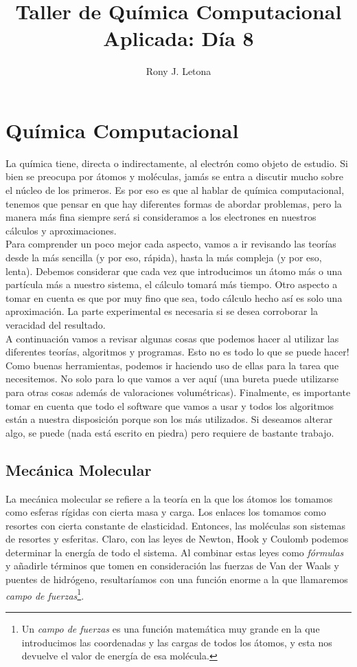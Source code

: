 \documentclass[10pt,letterpaper]{article}
\author{Rony J. Letona}
\title{Taller de Qu\'imica Computacional Aplicada: D\'ia 8}
\begin{document}
\maketitle

\section{Qu\'imica Computacional}
La qu\'imica tiene, directa o indirectamente, al electr\'on como objeto de estudio. Si bien se preocupa por \'atomos y mol\'eculas, jam\'as se entra a discutir mucho sobre el n\'ucleo de los primeros. Es por eso es que al hablar de qu\'imica computacional, tenemos que pensar en que hay diferentes formas de abordar problemas, pero la manera m\'as fina siempre ser\'a si consideramos a los electrones en nuestros c\'alculos y aproximaciones.\\

Para comprender un poco mejor cada aspecto, vamos a ir revisando las teor\'ias desde la m\'as sencilla (y por eso, r\'apida), hasta la m\'as compleja (y por eso, lenta). Debemos considerar que cada vez que introducimos un \'atomo m\'as o una part\'icula m\'as a nuestro sistema, el c\'alculo tomar\'a m\'as tiempo. Otro aspecto a tomar en cuenta es que por muy fino que sea, todo c\'alculo hecho as\'i es solo una aproximaci\'on. La parte experimental es necesaria si se desea corroborar la veracidad del resultado.\\

A continuaci\'on vamos a revisar algunas cosas que podemos hacer al utilizar las diferentes teor\'ias, algoritmos y programas. Esto no es todo lo que se puede hacer! Como buenas herramientas, podemos ir haciendo uso de ellas para la tarea que necesitemos. No solo para lo que vamos a ver aqu\'i (una bureta puede utilizarse para otras cosas adem\'as de valoraciones volum\'etricas). Finalmente, es importante tomar en cuenta que todo el software que vamos a usar y todos los algoritmos est\'an a nuestra disposici\'on porque son los m\'as utilizados. Si deseamos alterar algo, se puede (nada est\'a escrito en piedra) pero requiere de bastante trabajo.

\subsection{Mec\'anica Molecular}
La mec\'anica molecular se refiere a la teor\'ia en la que los \'atomos los tomamos como esferas r\'igidas con cierta masa y carga. Los enlaces los tomamos como resortes con cierta constante de elasticidad. Entonces, las mol\'eculas son sistemas de resortes y esferitas. Claro, con las leyes de Newton, Hook y Coulomb podemos determinar la energ\'ia de todo el sistema. Al combinar estas leyes como \emph{f\'ormulas} y a\~nadirle t\'erminos que tomen en consideraci\'on las fuerzas de Van der Waals y puentes de hidr\'ogeno, resultar\'iamos con una funci\'on enorme a la que llamaremos \emph{campo de fuerzas}\footnote{Un \emph{campo de fuerzas} es una funci\'on matem\'atica muy grande en la que introducimos las coordenadas y las cargas de todos los \'atomos, y esta nos devuelve el valor de energ\'ia de esa mol\'ecula.}.\\
\end{document}
